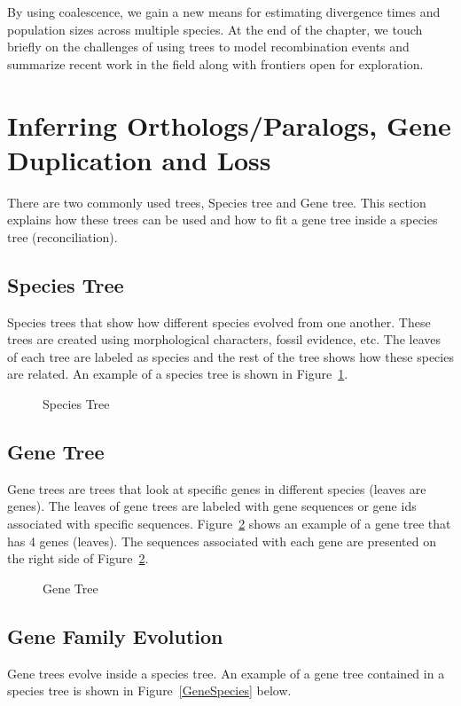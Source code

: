 By using coalescence, we gain a new means for estimating divergence times and population sizes across multiple species. At the end of the chapter, we touch briefly on the challenges of using trees to model recombination events and summarize recent work in the field along with frontiers open for exploration.

\section{Inferring Orthologs/Paralogs, Gene Duplication and Loss}

\noindent There are two commonly used trees, Species tree and Gene tree. This section explains how these trees can be used and how to fit a gene tree inside a species tree (reconciliation).

\subsection {Species Tree}
Species trees that show how different species evolved from one another. These trees are created using morphological characters, fossil evidence, etc. The leaves of each tree are labeled as species and the rest of the tree shows how these species are related.  An example of a species tree is shown in Figure~\ref{SpeciesTree}.

\begin{figure}[H]
  \centering
  \caption{Species Tree}
  \label{SpeciesTree}
\end{figure}

\subsection {Gene Tree}
Gene trees are trees that look at specific genes in different species (leaves are genes). The leaves of gene trees are labeled with gene sequences or gene ids associated with specific sequences. Figure~\ref{GeneTree} shows an example of a gene tree that has 4 genes (leaves). The sequences associated with each gene are presented on the right side of Figure~\ref{GeneTree}.
\begin{figure}[H]
  \centering
  \caption{Gene Tree}
  \label{GeneTree}
\end{figure}

\subsection{Gene Family Evolution}
Gene trees evolve inside a species tree.  An example of a gene tree contained in a species tree is shown in Figure~\ref{GeneSpecies} below.

